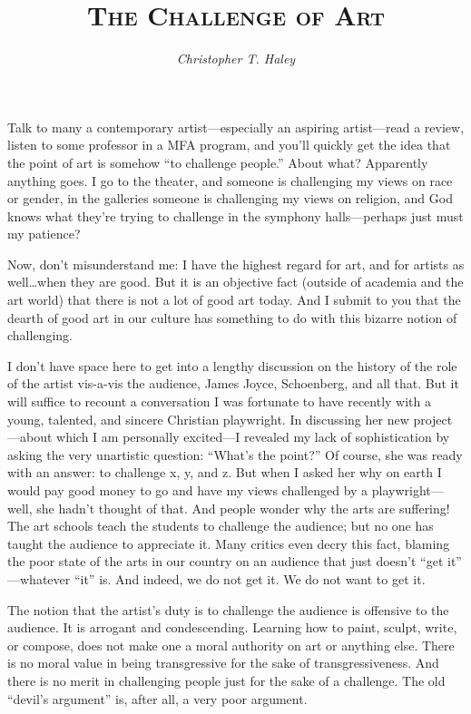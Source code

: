 \documentclass[letterpaper]{article}
\title{\textsc{The Challenge of Art}}
\author{\emph{Christopher T. Haley}}
\date{}
\begin{document}
\maketitle

Talk to many a contemporary artist---especially an aspiring
artist---read a review, listen to some professor in a MFA program,
and you'll quickly get the idea that the point of art is somehow ``to
challenge people.'' About what? Apparently anything goes. I go to the
theater, and someone is challenging my views on race or gender, in the
galleries someone is challenging my views on religion, and God knows
what they're trying to challenge in the symphony halls---perhaps just
must my patience?

Now, don't misunderstand me: I have the highest regard for art, and
for artists as well{\ldots}when they are good. But it is an objective
fact (outside of academia and the art world) that there is not a lot
of good art today. And I submit to you that the dearth of good art in
our culture has something to do with this bizarre notion of
challenging.

I don't have space here to get into a lengthy discussion on the
history of the role of the artist vis-a-vis the audience, James Joyce,
Schoenberg, and all that. But it will suffice to recount a
conversation I was fortunate to have recently with a young, talented,
and sincere Christian playwright. In discussing her new
project---about which I am personally excited---I revealed my lack of
sophistication by asking the very unartistic question: ``What's the
point?'' Of course, she was ready with an answer: to challenge x, y,
and z. But when I asked her why on earth I would pay good money to go
and have my views challenged by a playwright---well, she hadn't
thought of that. And people wonder why the arts are suffering! The art
schools teach the students to challenge the audience; but no one has
taught the audience to appreciate it. Many critics even decry this
fact, blaming the poor state of the arts in our country on an audience
that just doesn't ``get it'' ---whatever ``it'' is. And indeed, we do
not get it. We do not want to get it.

The notion that the artist's duty is to challenge the audience is
offensive to the audience. It is arrogant and condescending. Learning
how to paint, sculpt, write, or compose, does not make one a moral
authority on art or anything else. There is no moral value in being
transgressive for the sake of transgressiveness. And there is no merit
in challenging people just for the sake of a challenge. The old
``devil's argument'' is, after all, a very poor argument.
\end{document}
